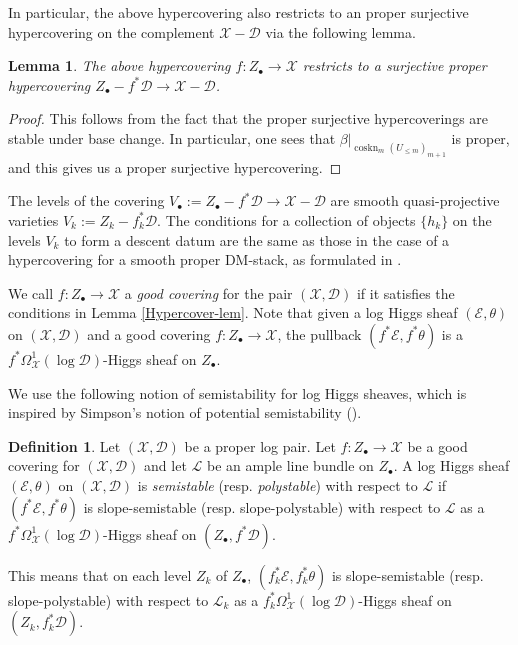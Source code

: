 \documentclass[a4paper]{amsart}
\newtheorem{lemma}[theorem]{Lemma}
\theoremstyle{definition}
\newtheorem{definition}[theorem]{Definition}
\begin{document}
In particular, the above hypercovering also restricts to an proper surjective hypercovering on the complement $\mathscr{X}-\mathscr{D}$ via the following lemma.

\begin{lemma}\label{hypercoveropen-lem}
    The above hypercovering $f:Z_{\bullet} \to \mathscr{X}$ restricts to a surjective proper hypercovering $Z_\bullet-f^*\mathscr{D} \to \mathscr{X}-\mathscr{D}$.
\end{lemma}

\begin{proof}
    This follows from the fact that the proper surjective hypercoverings are stable under base change. In particular, one sees that $\beta|_{\operatorname{coskn}_m(U_{\le m})_{m+1}}$ is proper, and this gives us a proper surjective hypercovering. 
\end{proof}

The levels of the covering $V_\bullet:=Z_\bullet-f^*\mathscr{D}\to\mathscr{X}-\mathscr{D}$ are smooth quasi-projective varieties $V_k:=Z_k-f_k^*\mathscr{D}$. The conditions for a collection of objects $\{h_k\}$ on the levels $V_k$ to form a descent datum are the same as those in the case of a hypercovering for a smooth proper DM-stack, as formulated in \cite[Section 5]{simpsonstacks}. 

We call $f:Z_\bullet\to\mathscr{X}$ a \emph{good covering} for the pair $(\mathscr{X},\mathscr{D})$ if it satisfies the conditions in Lemma \ref{Hypercover-lem}. Note that given a log Higgs sheaf $(\mathcal{E},\mathcal{\theta})$ on $(\mathscr{X},\mathscr{D})$ and a good covering $f:Z_\bullet\to\mathscr{X}$, the pullback $(f^*\mathcal{E},f^*\theta)$ is a $f^*\Omega^1_{\mathscr{X}}(\log\mathscr{D})$-Higgs sheaf on $Z_\bullet$.

We use the following notion of semistability for log Higgs sheaves, which is inspired by Simpson's notion of potential semistability (\cite[Definition 9.1]{simpsonstacks}).

\begin{definition}\label{Potential-ss}
Let $(\mathscr{X},\mathscr{D})$ be a proper log pair. Let $f:Z_\bullet\to \mathscr{X}$ be a good covering for $(\mathscr{X},\mathscr{D})$ and let $\mathcal{L}$ be an ample line bundle on $Z_\bullet$. A log Higgs sheaf $(\mathcal{E},\theta)$ on $(\mathscr{X},\mathscr{D})$ is \emph{semistable} (resp. \emph{polystable}) with respect to $\mathcal{L}$ if $(f^*\mathcal{E},f^*\theta)$ is slope-semistable (resp. slope-polystable) with respect to $\mathcal{L}$ as a $f^*\Omega^1_{\mathscr{X}}(\log\mathscr{D})$-Higgs sheaf on $(Z_\bullet,f^*\mathscr{D})$.

This means that on each level $Z_k$ of $Z_\bullet$, $(f_k^*\mathcal{E},f_k^*\theta)$ is slope-semistable (resp. slope-polystable) with respect to $\mathcal{L}_k$ as a $f_k^*\Omega^1_{\mathscr{X}}(\log\mathscr{D})$-Higgs sheaf on $(Z_k,f_k^*\mathscr{D})$.
\end{definition}
\end{document}
